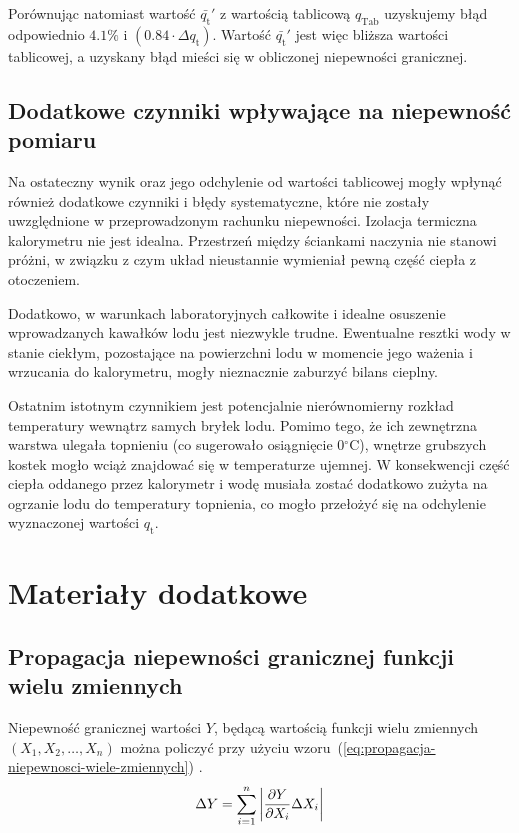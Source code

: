 \documentclass[twocolumn, a4paper, polish, 10pt]{article}
\newcommand{\qT}{\ensuremath{ q_{\mathrm{t}} }}
\newcommand{\degCel}{\ensuremath{ \mathrm{^{\circ}C} }}
\begin{document}
Porównując natomiast wartość $\bar{\qT}'$ z wartością tablicową $q_{\mathrm{Tab}}$ uzyskujemy błąd odpowiednio $4.1\%$ i $(0.84 \cdot \Delta \qT)$. Wartość $\bar{\qT}'$ jest więc bliższa wartości tablicowej, a uzyskany błąd mieści się w obliczonej niepewności granicznej.

\subsection{Dodatkowe czynniki wpływające na niepewność pomiaru}
Na ostateczny wynik oraz jego odchylenie od wartości tablicowej mogły wpłynąć również dodatkowe czynniki i błędy systematyczne, które nie zostały uwzględnione w przeprowadzonym rachunku niepewności.
Izolacja termiczna kalorymetru nie jest idealna. Przestrzeń między ściankami naczynia nie stanowi próżni, w związku z czym układ nieustannie wymieniał pewną część ciepła z otoczeniem.

Dodatkowo, w warunkach laboratoryjnych całkowite i idealne osuszenie wprowadzanych kawałków lodu jest niezwykle trudne.
Ewentualne resztki wody w stanie ciekłym, pozostające na powierzchni lodu w momencie jego ważenia i wrzucania do kalorymetru, mogły nieznacznie zaburzyć bilans cieplny.

Ostatnim istotnym czynnikiem jest potencjalnie nierównomierny rozkład temperatury wewnątrz samych bryłek lodu.
Pomimo tego, że ich zewnętrzna warstwa ulegała topnieniu (co sugerowało osiągnięcie $0\degCel$), wnętrze grubszych kostek mogło wciąż znajdować się w temperaturze ujemnej.
W konsekwencji część ciepła oddanego przez kalorymetr i wodę musiała zostać dodatkowo zużyta na ogrzanie lodu do temperatury topnienia, co mogło przełożyć się na odchylenie wyznaczonej wartości $\qT$.

\section{Materiały dodatkowe}
\subsection{Propagacja niepewności granicznej funkcji wielu zmiennych}
Niepewność granicznej wartości $Y$, będącą wartością funkcji wielu zmiennych $(X_1, X_2, \dots, X_n)$ można policzyć przy użyciu wzoru~(\ref{eq:propagacja-niepewnosci-wiele-zmiennych}) \cite{smop-wyklad}.
\begin{equation}
    \Delta Y = \sum_{i=1}^n \left|
            \pdv{Y}{X_i} \Delta X_i
        \right|
    \label{eq:propagacja-niepewnosci-wiele-zmiennych}
\end{equation}
\end{document}
